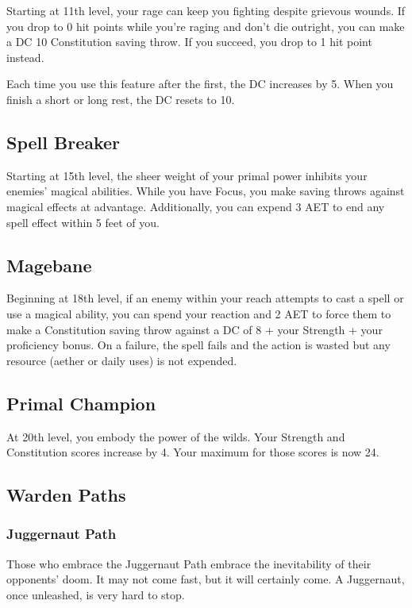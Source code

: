 Starting at 11th level, your rage can keep you fighting despite grievous wounds. If you drop to 0 hit points while you’re raging and don’t die outright, you can make a DC 10 Constitution saving throw. If you succeed, you drop to 1 hit point instead.

Each time you use this feature after the first, the DC increases by 5. When you finish a short or long rest, the DC resets to 10.

\subsection{Spell Breaker}
Starting at 15th level, the sheer weight of your primal power inhibits your enemies' magical abilities. While you have Focus, you make saving throws against magical effects at advantage. Additionally, you can expend 3 AET to end any spell effect within 5 feet of you.

\subsection{Magebane}

Beginning at 18th level, if an enemy within your reach attempts to cast a spell or use a magical ability, you can spend your reaction and 2 AET to force them to make a Constitution saving throw against a DC of 8 + your Strength + your proficiency bonus. On a failure, the spell fails and the action is wasted but any resource (aether or daily uses) is not expended.

\subsection{Primal Champion}

At 20th level, you embody the power of the wilds. Your Strength and Constitution scores increase by 4. Your maximum for those scores is now 24.

\subsection{Warden Paths}

\subsubsection{Juggernaut Path}

Those who embrace the Juggernaut Path embrace the inevitability of their opponents' doom. It may not come fast, but it will certainly come. A Juggernaut, once unleashed, is very hard to stop.

